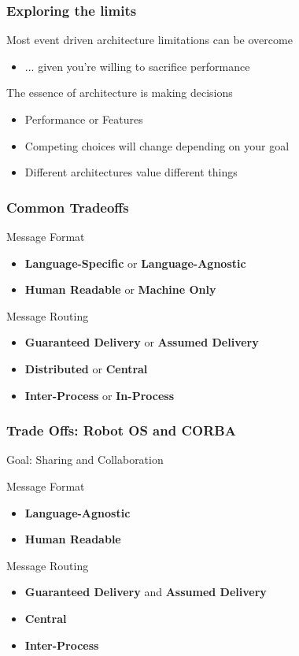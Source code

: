 \documentclass{beamer}
\begin{document}
	\begin{frame}
		\frametitle {Exploring the limits}
		
		Most event driven architecture limitations can be overcome
		\begin{itemize}
			\item ... given you're willing to sacrifice performance
		\end{itemize}
		
		The essence of architecture is making decisions
		\begin{itemize}
			\item Performance or Features
			\item Competing choices will change depending on your goal
			\item Different architectures value different things
		\end{itemize}
	\end{frame}
	
	\begin{frame}
		\frametitle{Common Tradeoffs}
		
		Message Format
		\begin{itemize}
			\item \textbf{Language-Specific} or \textbf{Language-Agnostic}
			\item \textbf{Human Readable} or \textbf{Machine Only}
		\end{itemize}
		
		Message Routing
		\begin{itemize}
			\item \textbf{Guaranteed Delivery} or \textbf{Assumed Delivery}
			\item \textbf{Distributed} or \textbf{Central}
			\item \textbf{Inter-Process} or \textbf{In-Process}
		\end{itemize}
	\end{frame}
	
	\begin{frame}
		\frametitle{Trade Offs: Robot OS and CORBA}
		Goal: Sharing and Collaboration
		
		Message Format
		\begin{itemize}
			\item \textbf{Language-Agnostic}
			\item \textbf{Human Readable}
		\end{itemize}
		
		Message Routing
		\begin{itemize}
			\item \textbf{Guaranteed Delivery} and \textbf{Assumed Delivery}
			\item \textbf{Central}
			\item \textbf{Inter-Process}
		\end{itemize}
	\end{frame}
	
\end{document}
